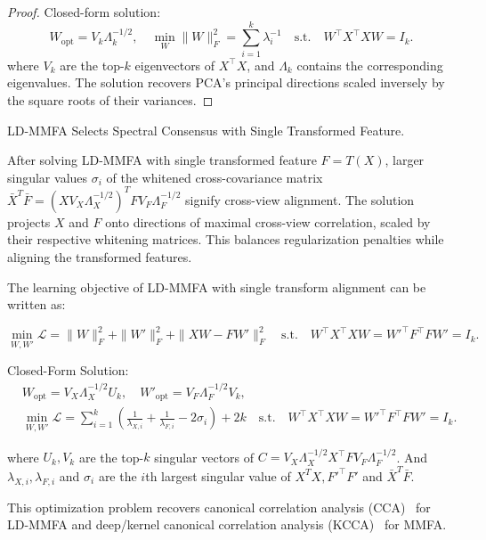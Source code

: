 \begin{proof}
Closed-form solution:  
\begin{equation}
    W_{\text{opt}} = V_k \Lambda_k^{-1/2}, \quad \min_{W} \|W\|_F^2 = \sum_{i = 1}^k \lambda_{i}^{-1} \quad \text{s.t.} \quad W^\top X^\top X W = I_k.
\end{equation}  
where \( V_k \) are the top-\(k \) eigenvectors of \( X^\top X \), and \( \Lambda_k \) contains the corresponding eigenvalues. The solution recovers PCA’s principal directions scaled inversely by the square roots of their variances.  
    
\end{proof}
 

\begin{lemma}\label{lem:CCA}LD-MMFA Selects Spectral Consensus with Single Transformed Feature.


After solving LD-MMFA with single transformed feature $F = T(X)$, larger singular values \( \sigma_i \) of the whitened cross-covariance matrix $\bar{X}^T \bar{F} = (X V_X\Lambda_X^{-1/2})^TFV_F\Lambda_F^{-1/2}$ signify cross-view alignment. The solution projects \( X \) and \( F \) onto directions of maximal cross-view correlation, scaled by their respective whitening matrices. This balances regularization penalties while aligning the transformed features.  


The learning objective of LD-MMFA with single transform alignment can be written as:

\begin{equation}
    \min_{W, W'} \mathcal{L} = \|W\|_F^2 + \|W'\|_F^2 + \|XW - FW'\|_F^2 \quad \text{s.t.} \quad W^\top X^\top X W = W'^\top F^\top F W' = I_k.
\end{equation}  

Closed-Form Solution:  
\begin{equation}
\begin{aligned}
    & W_{\text{opt}} = V_X\Lambda_X^{-1/2} U_k, \quad W'_{\text{opt}} = V_F\Lambda_F^{-1/2} V_k, \\
    & \min_{W, W'} \mathcal{L} = \sum_{i=1}^{k} ( \frac{1}{\lambda_{X,i}} + \frac{1}{\lambda_{F,i}} - 2 \sigma_i ) + 2k \quad \text{s.t.} \quad W^\top X^\top X W = W'^\top F^\top F W' = I_k.
\end{aligned}
\end{equation}  


where \( U_k, V_k \) are the top-\(k \) singular vectors of \( C = V_X\Lambda_X^{-1/2} X^\top F V_F\Lambda_F^{-1/2} \). And $\lambda_{X,i}, \lambda_{F,i}$ and $\sigma_i$ are the $i$th largest singular value of $X^TX, F'^\top F'$ and $\bar{X}^T \bar{F}$.

This optimization problem recovers canonical correlation analysis (CCA)~\cite{thompson2000canonical} for LD-MMFA and deep/kernel canonical correlation analysis (KCCA)~\cite{fukumizu2007statistical} for MMFA.

\end{lemma}

